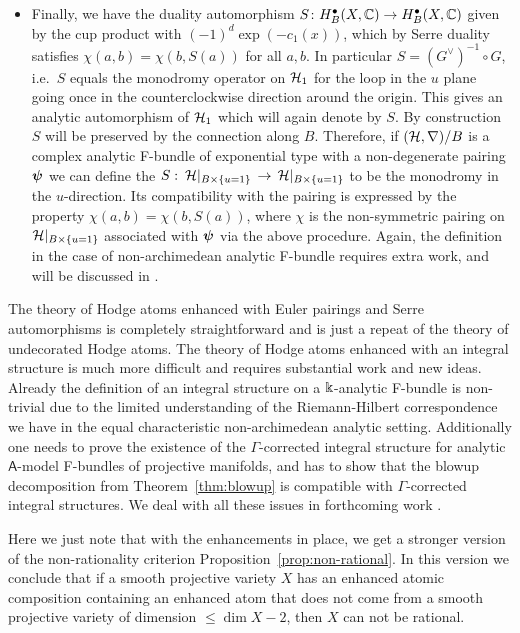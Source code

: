 \documentclass[twoside,leqno]{article}
\numberwithin{equation}{section}
\theoremstyle{plain}
\theoremstyle{definition}
\begin{document}
\begin{itemize}[wide]
\qquad Extra work is required to carry out this comparison for the non-archimedean $\mathsf{A}$-model F-bundles, and this will be discussed in more detail in \cite{KKPY-Gamma}.
\item[(d)] Finally, we have the duality  automorphism $S \colon H^{\bullet}_{B}(X,\mathbb C) \to  H^{\bullet}_{B}(X,\mathbb C)$ given by the cup product with $(-1)^{d}\exp(-c_{1}(x))$, which by Serre duality satisfies $\chi(a,b) = \chi(b,S(a))$ for all $a, b$. In particular $S = (G^{\vee})^{-1}\circ G$, i.e.\ $S$ equals the monodromy operator on $\mathcal H_{1}$ for the loop in the $u$ plane going once in the counterclockwise direction around the origin. This gives an analytic automorphism of $\mathcal H_{1}$ which will again denote by $S$. By construction $S$ will be preserved by the connection along $B$. Therefore, if $(\mathcal H,\nabla)/B$ is a complex analytic F-bundle of exponential type with a non-degenerate pairing $\boldsymbol{\psi}$ we can define the  $S \, \colon \, \mathcal H|_{B\times \{u=1\}} \, \to \, \mathcal H|_{B\times \{u=1\}}$ to be the monodromy in the $u$-direction. Its compatibility with the pairing is expressed by the property $\chi(a,b) =\chi(b,S(a))$, where $\chi$ is the non-symmetric pairing on $\mathcal H|_{B\times \{u=1\}}$ associated with $\boldsymbol{\psi}$ via the above procedure.  Again, the definition in the case of non-archimedean analytic F-bundle requires extra work, and will be discussed in \cite{KKPY-Gamma}.
\end{itemize}

\medskip

The theory  of Hodge atoms enhanced with Euler pairings and Serre automorphisms is completely straightforward and is just a repeat of the theory of undecorated Hodge atoms. The theory of Hodge atoms enhanced with an integral structure is much more difficult and requires substantial work and new ideas. Already the definition of an integral structure on a $\Bbbk$-analytic F-bundle is non-trivial due to the limited understanding of the Riemann-Hilbert correspondence  we have in the equal characteristic non-archimedean analytic setting. Additionally one needs to prove the existence of the $\Gamma$-corrected integral structure for  analytic $\mathsf{A}$-model F-bundles of projective manifolds, and has to show that the blowup decomposition from Theorem~\ref{thm:blowup} is compatible with $\Gamma$-corrected integral structures. We deal with all these issues in  forthcoming work \cite{KKPY-Gamma}. 

Here we just note that with the enhancements in place, we get a stronger version of the non-rationality criterion Proposition~\ref{prop:non-rational}. In this version we conclude that if a smooth projective variety $X$ has an enhanced atomic composition containing an enhanced atom that does not come from a smooth projective variety of dimension $\leq \dim X - 2$, then $X$ can not be rational. 
\end{document}
